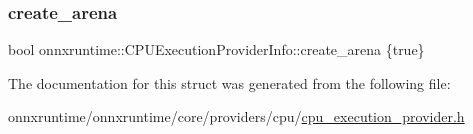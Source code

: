 \subsubsection{\texorpdfstring{create\+\_\+arena}{create\_arena}}
{\footnotesize\ttfamily bool onnxruntime\+::\+C\+P\+U\+Execution\+Provider\+Info\+::create\+\_\+arena \{true\}}



The documentation for this struct was generated from the following file\+:\begin{DoxyCompactItemize}
\item 
onnxruntime/onnxruntime/core/providers/cpu/\mbox{\hyperlink{cpu__execution__provider_8h}{cpu\+\_\+execution\+\_\+provider.\+h}}\end{DoxyCompactItemize}
